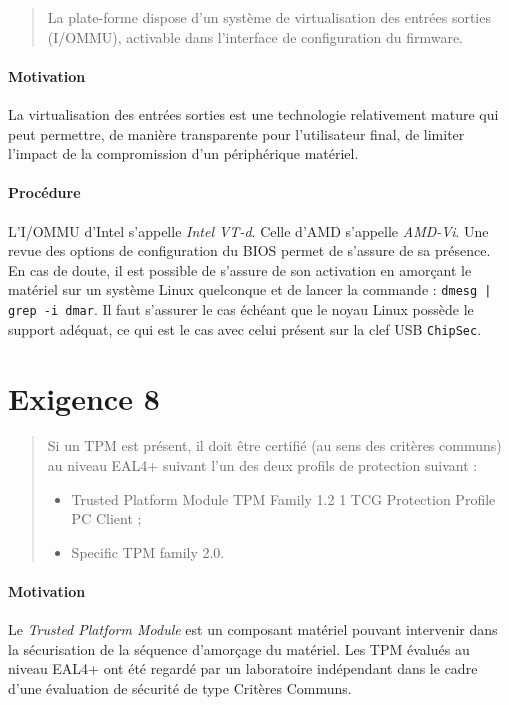 \documentclass{report}
\begin{document}
\begin{quote}
  La plate-forme dispose d’un système de virtualisation des entrées sorties
  (I/OMMU), activable dans l’interface de configuration du firmware.
\end{quote}

\paragraph{Motivation}
%
La virtualisation des entrées sorties est une technologie relativement mature
qui peut permettre, de manière transparente pour l’utilisateur final, de limiter
l’impact de la compromission d’un périphérique matériel.

\paragraph{Procédure}
%
L’I/OMMU d’Intel s’appelle \emph{Intel VT-d}. Celle d’AMD s’appelle
\emph{AMD-Vi}.
%
Une revue des options de configuration du BIOS permet de s’assure de sa
présence.
%
En cas de doute, il est possible de s’assure de son activation en amorçant le
matériel sur un système Linux quelconque et de lancer la commande :
\texttt{dmesg | grep -i dmar}.
%
Il faut s’assurer le cas échéant que le noyau Linux possède le support adéquat,
ce qui est le cas avec celui présent sur la clef USB \texttt{ChipSec}.

\section{Exigence 8}

\begin{quote}
  Si un TPM est présent, il doit être certifié (au sens des critères communs) au
  niveau EAL4+ suivant l’un des deux profils de protection suivant :
  \begin{itemize}
  \item Trusted Platform Module TPM Family 1.2 1 TCG Protection Profile PC
    Client ;
  \item Specific TPM family 2.0.
  \end{itemize}
\end{quote}

\paragraph{Motivation}
%
Le \emph{Trusted Platform Module} est un composant matériel pouvant intervenir
dans la sécurisation de la séquence d’amorçage du matériel.
%
Les TPM évalués au niveau EAL4+ ont été regardé par un laboratoire indépendant
dans le cadre d’une évaluation de sécurité de type Critères Communs.
\end{document}
